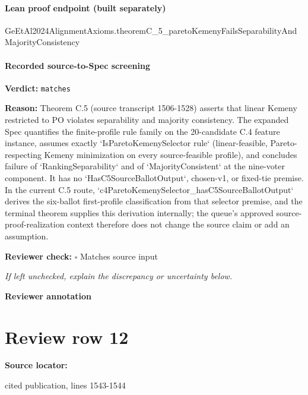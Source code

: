 \documentclass[10pt]{article}
\newcommand{\reviewerbox}{%
  \par\noindent\fbox{\parbox{0.96\linewidth}{\rule{0pt}{0.38in}}}\par
}
\newcommand{\reviewmatch}[1]{%
  \par\noindent\textbf{Reviewer check:} $\square$\; #1\par
  \noindent\emph{If left unchecked, explain the discrepancy or uncertainty below.}\par
}
\begin{document}
\paragraph{Lean proof endpoint (built separately)}\begin{ReviewVerbatim}
GeEtAl2024AlignmentAxioms.theoremC_5_paretoKemenyFailsSeparabilityAndMajorityConsistency
\end{ReviewVerbatim}

\paragraph{Recorded source-to-Spec screening}
\textbf{Verdict:} \texttt{matches}
\\
{\raggedright
\textbf{Reason:} Theorem C.\allowbreak{}5 (source transcript 1506-\allowbreak{}1528) asserts that linear Kemeny restricted to PO violates separability and majority consistency.\allowbreak{} The expanded Spec quantifies the finite-\allowbreak{}profile rule family on the 20-\allowbreak{}candidate C.\allowbreak{}4 feature instance, assumes exactly `IsParetoKemenySelector rule` (linear-\allowbreak{}feasible, Pareto-\allowbreak{}respecting Kemeny minimization on every source-\allowbreak{}feasible profile), and concludes failure of `RankingSeparability` and of `MajorityConsistent` at the nine-\allowbreak{}voter component.\allowbreak{} It has no `HasC5SourceBallotOutput`, chosen-\allowbreak{}v1, or fixed-\allowbreak{}tie premise.\allowbreak{} In the current C.\allowbreak{}5 route, `c4ParetoKemenySelector\_\allowbreak{}hasC5SourceBallotOutput` derives the six-\allowbreak{}ballot first-\allowbreak{}profile classification from that selector premise, and the terminal theorem supplies this derivation internally;\allowbreak{} the queue's approved source-\allowbreak{}proof-\allowbreak{}realization context therefore does not change the source claim or add an assumption.\allowbreak{}
\par}
\reviewmatch{Matches source input}
\noindent\textbf{Reviewer annotation}\par
\reviewerbox
\clearpage
\hypertarget{source-claim-c7e3d91ee78bfd29}{}
\section*{Review row 12}
\textbf{Source locator:} {\footnotesize\raggedright cited publication, lines 1543-\allowbreak{}1544\par}
\end{document}
